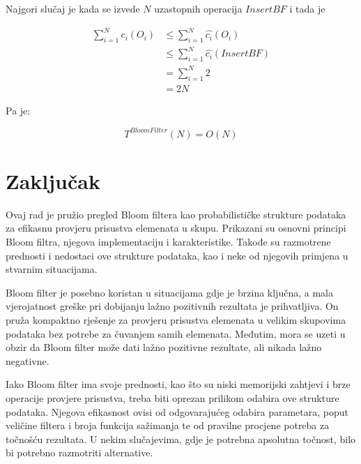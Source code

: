 \documentclass{foi}
\begin{document}
Najgori slučaj je kada se izvede $N$ uzastopnih operacija $InsertBF$ i tada je

\begin{equation*}
    \begin{aligned}
    \sum_{i=1}^{N} c_i \left(O_i\right) & \leq \sum_{i=1}^{N} \hat{c_i} \left(O_i\right) \\
    & \leq  \sum_{i=1}^{N} \hat{c_i} \left( InsertBF \right) \\
    & = \sum_{i=1}^{N} 2 \\
    & = 2N
    \end{aligned}
\end{equation*}

Pa je:

$$ T^{BloomFilter} \left( N \right) = O \left( N \right)$$

\chapter{Zaključak}

Ovaj rad je pružio pregled Bloom filtera kao probabilističke strukture podataka za efikasnu provjeru prisustva elemenata u skupu. Prikazani su osnovni principi Bloom filtra, njegova implementaciju i karakteristike. Takođe su razmotrene prednosti i nedostaci ove strukture podataka, kao i neke od njegovih primjena u stvarnim situacijama.

Bloom filter je posebno koristan u situacijama gdje je brzina ključna, a mala vjerojatnost greške pri dobijanju lažno pozitivnih rezultata je prihvatljiva. On pruža kompaktno rješenje za provjeru prisustva elemenata u velikim skupovima podataka bez potrebe za čuvanjem samih elemenata. Međutim, mora se uzeti u obzir da Bloom filter može dati lažno pozitivne rezultate, ali nikada lažno negativne.

Iako Bloom filter ima svoje prednosti, kao što su niski memorijski zahtjevi i brze operacije provjere prisustva, treba biti oprezan prilikom odabira ove strukture podataka. Njegova efikasnost ovisi od odgovarajućeg odabira parametara, poput veličine filtera i broja funkcija sažimanja te od pravilne procjene potreba za točnošću rezultata. U nekim slučajevima, gdje je potrebna apsolutna točnost, bilo bi potrebno razmotriti alternative.

\listoffigures
{}
 
\listoftables
{}
  
\printbibliography[title=Popis literature]
\end{document}
